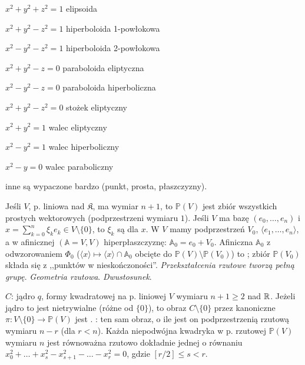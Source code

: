 \begin{multicols}{2}
\begin{enumx} 
\item $x^2 + y^2 + z^2 = 1$ \hfill elipsoida
\item $x^2 + y^2 - z^2 = 1$ \hfill hiperboloida 1-powłokowa
\item $x^2 - y^2 - z^2 = 1$ \hfill hiperboloida 2-powłokowa
\item $x^2 + y^2 - z = 0$ \hfill paraboloida eliptyczna
\item $x^2 - y^2 - z = 0$ \hfill paraboloida hiperboliczna
\item $x^2 + y^2 - z^2 = 0$ \hfill stożek eliptyczny
\item $x^2 + y^2 = 1$ \hfill walec eliptyczny
\item $x^2 - y^2 = 1$ \hfill walec hiperboliczny
\item $x^2 - y = 0$ \hfill walec paraboliczny
\item inne są wypaczone bardzo (punkt, prosta, płaszczyzny). %
\end{enumx}
\end{multicols}
   
Jeśli  $V$, p. liniowa nad $\mathfrak K$, ma wymiar $n+1$, to  $\mathbb P(V)$ jest zbiór wszystkich prostych wektorowych (podprzestrzeni wymiaru $1$).
Jeśli $V$ ma bazę $(e_0, \dots, e_n)$ i $x = \sum_{k=0}^n \xi_k e_k \in V \setminus \{0\}$, to $\xi_k$ są  dla $x$.
W $V$ mamy podprzestrzeń $V_0$, $\langle e_1, \dots, e_n\rangle$, a w afinicznej $(\mathbb A = V, V)$ hiperpłaszczyznę: $\mathbb A_0 = e_0 + V_0$.
Afiniczna $\mathbb A_0$ z odwzorowaniem $\Phi_0$ ($\langle x \rangle \mapsto \langle x \rangle \cap \mathbb A_0$ obcięte do $\mathbb P(V) \setminus \mathbb P(V_0)$) to ; zbiór $\mathbb P(V_0)$ składa się z ,,punktów w nieskończoności''.
\emph{Przekształcenia rzutowe tworzą pełną grupę}.
\emph{Geometria rzutowa}.
\emph{Dwustosunek}.

 $C$:  jądro $q$, formy kwadratowej na p. liniowej $V$ wymiaru $n + 1 \ge 2$ nad $\mathbb{R}$.
Jeżeli jądro to jest nietrywialne (różne od $\{0\}$), to obraz $C \setminus \{0\}$ przez kanoniczne $\pi \colon V \setminus \{0\} \to \mathbb P(V)$ jest .
: ten sam obraz, o ile jest on podprzestrzenią rzutową wymiaru $n - r$ (dla $r < n$).
Każda niepodwójna kwadryka w p. rzutowej $\mathbb P(V)$ wymiaru $n$ jest równoważna rzutowo dokładnie jednej o równaniu $x_0^2 + \dots + x_s^2 - x_{s+1}^2 - \dots  - x_r^2 = 0$, gdzie $[r/2] \le s < r$.